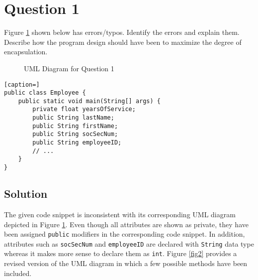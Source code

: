 
\section{Question 1}

Figure \ref{fig1} shown below has errors/typos.
Identify the errors and explain them.
Describe how the program design should have been to maximize the degree of encapsulation.

\begin{figure}
\centering
\caption{UML Diagram for Question 1}\label{fig1}
\end{figure}

\lstset{language=java, tabsize=4}
\begin{lstlisting}[caption=]
public class Employee {
	public static void main(String[] args) {
		private float yearsOfService;
		public String lastName;
		public String firstName;
		public String socSecNum;
		public String employeeID;
		// ...
	}
}
\end{lstlisting}

\subsection*{Solution}

The given code snippet is inconsistent with its corresponding UML diagram depicted in Figure \ref{fig1}.
Even though all attributes are shown as private, they have been assigned \texttt{public} modifiers in the corresponding code snippet.
In addition, attributes such as \texttt{socSecNum} and \texttt{employeeID} are declared with \texttt{String} data type whereas it makes more sense to declare them as \texttt{int}.
Figure \ref{fig2} provides a revised version of the UML diagram in which a few possible methods have been included.

